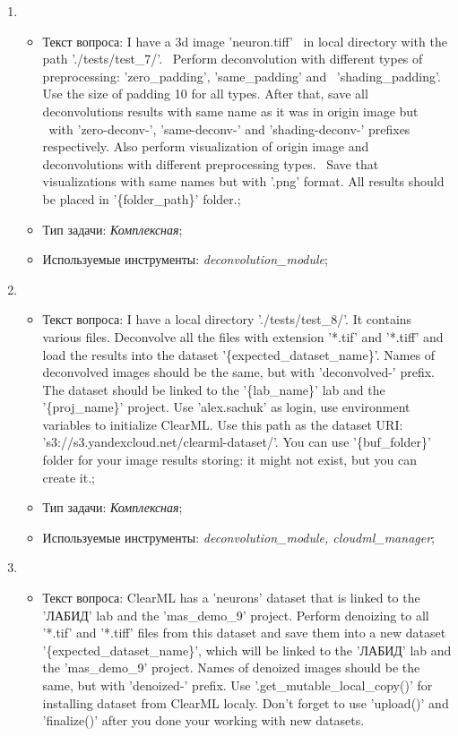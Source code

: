\begin{enumerate}
	\item \begin{itemize}
		\item Текст вопроса: I have a 3d image 'neuron.tiff' \
in local directory with the path './tests/test\_7/'. \
Perform deconvolution with different types of preprocessing: 'zero\_padding', 'same\_padding' and \
'shading\_padding'. Use the size of padding 10 for all types.
After that, save all deconvolutions results with same name as it was in origin image but \
with 'zero-deconv-', 'same-deconv-' and 'shading-deconv-' prefixes respectively.
Also perform visualization of origin image and deconvolutions with different preprocessing types. \
Save that visualizations with same names but with '.png' format.
All results should be placed in '\{folder\_path\}' folder.;
		\item Тип задачи: \textit{Комплексная};
		\item Используемые инструменты: \textit{deconvolution\_module};
	\end{itemize}

	\item \begin{itemize}
		\item Текст вопроса: I have a local directory './tests/test\_8/'.
It contains various files.
Deconvolve all the files with extension '*.tif' and '*.tiff' and load the results into the dataset 
'\{expected\_dataset\_name\}'.
Names of deconvolved images should be the same, but with 'deconvolved-' prefix.
The dataset should be linked to the '\{lab\_name\}' lab and the '\{proj\_name\}' project.
Use 'alex.sachuk' as login, use environment variables to initialize ClearML.
Use this path as the dataset URI: 's3://s3.yandexcloud.net/clearml-dataset/'.
You can use '\{buf\_folder\}' folder for your image results storing: it might not exist, but you can create it.;
		\item Тип задачи: \textit{Комплексная};
		\item Используемые инструменты: \textit{deconvolution\_module, cloudml\_manager};
	\end{itemize}

	\item \begin{itemize}
		\item Текст вопроса: ClearML has a 'neurons' dataset that is linked to the 'ЛАБИД' 
lab and the 'mas\_demo\_9' project.
Perform denoizing to all '*.tif' and '*.tiff' files from this dataset and save them into a 
new dataset '\{expected\_dataset\_name\}',
which will be linked to the 'ЛАБИД' lab and the 'mas\_demo\_9' project.
Names of denoized images should be the same, but with 'denoized-' prefix.
Use '.get\_mutable\_local\_copy()' for installing dataset from ClearML localy.
Don't forget to use 'upload()' and 'finalize()' after you done your working with new datasets.
											

\end{itemize}
\end{enumerate}
